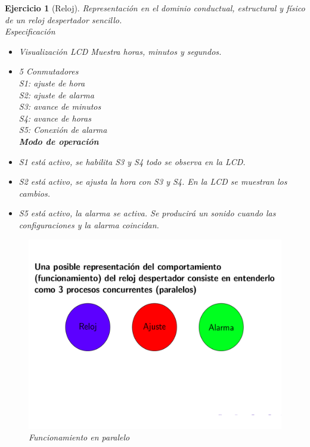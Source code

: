 \documentclass[12pt,letterpaper]{book}
\newtheorem{exercise}{Ejercicio}
\begin{document}
\begin{exercise}[Reloj]

Representación en el dominio conductual, estructural y físico de un reloj despertador sencillo.\\
Especificación

\begin{multicols}{2}
\begin{itemize}
\item Visualización LCD
Muestra horas, minutos y segundos.
\item 5 Conmutadores\\
S1: ajuste de hora\\
S2: ajuste de alarma\\
S3: avance de minutos\\
S4: avance de horas\\
 S5: Conexión de alarma\\
 

\textbf{ Modo de operación}
\item S1 está activo, se habilita S3 y S4 todo se observa en la LCD.
\item S2 está activo, se ajusta la hora con S3 y S4. En la LCD se muestran los cambios.
\item S5 está activo, la alarma se activa. Se producirá un sonido cuando las configuraciones y la alarma coincidan.

\end{itemize}


\begin{figure}[H]
\centering
\includegraphics[width=1\linewidth]{figures/repFun1.png}
\caption{Funcionamiento en paralelo}
\label{repFun1}
\end{figure}
\vspace{0.2cm}


\end{multicols}
\end{exercise}
\end{document}

